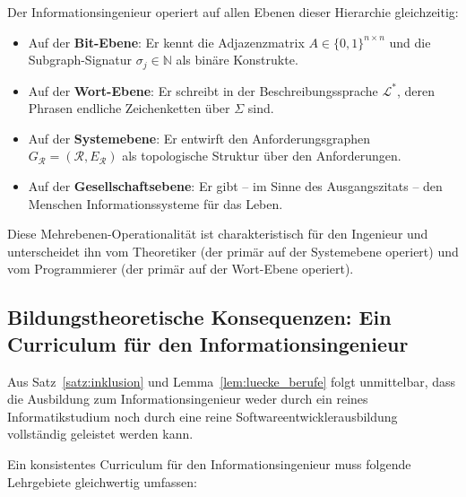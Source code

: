 ﻿\documentclass[a4paper,12pt]{report}
\theoremstyle{definition}
\begin{document}
Der Informationsingenieur operiert auf allen Ebenen dieser Hierarchie gleichzeitig:

\begin{itemize}
  \item Auf der \textbf{Bit-Ebene}: Er kennt die Adjazenzmatrix $A \in \{0,1\}^{n \times n}$
        und die Subgraph-Signatur $\sigma_j \in \mathbb{N}$ als binäre Konstrukte.
  \item Auf der \textbf{Wort-Ebene}: Er schreibt in der Beschreibungssprache $\mathcal{L}^*$,
        deren Phrasen endliche Zeichenketten über $\Sigma$ sind.
  \item Auf der \textbf{Systemebene}: Er entwirft den Anforderungsgraphen
        $G_\mathcal{R} = (\mathcal{R}, E_\mathcal{R})$ als topologische Struktur
        über den Anforderungen.
  \item Auf der \textbf{Gesellschaftsebene}: Er gibt -- im Sinne des Ausgangszitats --
        den Menschen Informationssysteme für das Leben.
\end{itemize}

Diese Mehrebenen-Operationalität ist charakteristisch für den Ingenieur und unterscheidet
ihn vom Theoretiker (der primär auf der Systemebene operiert) und vom Programmierer
(der primär auf der Wort-Ebene operiert).

\subsection{Bildungstheoretische Konsequenzen: Ein Curriculum für den Informationsingenieur}

Aus Satz~\ref{satz:inklusion} und Lemma~\ref{lem:luecke_berufe} folgt unmittelbar, dass
die Ausbildung zum Informationsingenieur weder durch ein reines Informatikstudium noch
durch eine reine Softwareentwicklerausbildung vollständig geleistet werden kann.

Ein konsistentes Curriculum für den Informationsingenieur muss folgende Lehrgebiete
gleichwertig umfassen:
\end{document}
